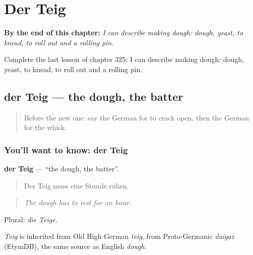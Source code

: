 
\chapter{Der Teig}
\label{ch:ge-der-teig}

\begin{chapteropening}
\textbf{By the end of this chapter:} \emph{I can describe making dough: dough, yeast, to knead, to roll out and a rolling pin.}

Complete the last lesson of chapter 325: I can describe making dough: dough, yeast, to knead, to roll out and a rolling pin.
\end{chapteropening}

\section[der Teig]{der Teig — the dough, the batter}

\label{lesson:GE-C325-teig}



\begin{quote}
Before the new one: say the German for to crack open, then the German for the whisk.
\end{quote}

\subsection*{You'll want to know: der Teig}
\textbf{der Teig} — \textquotedblleft{}the dough, the batter\textquotedblright{}.

\begin{quote}
Der Teig muss eine Stunde ruhen.
\end{quote}

\begin{quote}
\emph{The dough has to rest for an hour.}
\end{quote}

Plural: \emph{die Teige}.

\begin{cousinweb}
\emph{Teig} is inherited from Old High German \emph{teig}, from Proto-Germanic \emph{daigaz} (EtymDB), the same source as English \emph{dough}.
\end{cousinweb}

